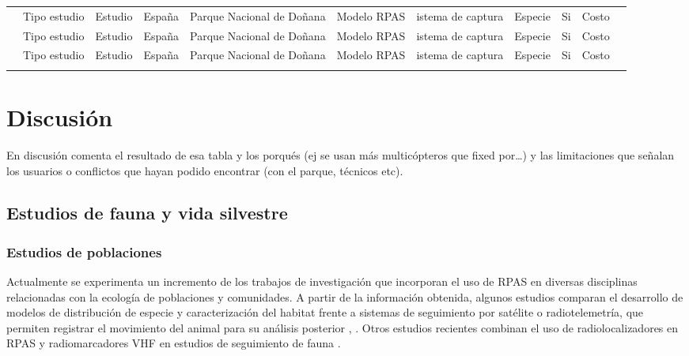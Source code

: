 \documentclass[11pt,]{article}
\begin{document}
\begin{sidewaystable}
\begin{tabular}{p{2.5cm}p{1cm}p{3cm}p{1cm}p{2cm}p{2cm}p{1cm}p{2cm}p{2cm}p{1cm}p{0.5cm}}
\cite{PazmanyMulero2015}  & Tipo estudio & Estudio & España & Parque Nacional de Doñana & Modelo RPAS & istema de captura & Especie & Si & Costo  \\ 
\cite{PazmanyMulero2015}  & Tipo estudio & Estudio & España & Parque Nacional de Doñana & Modelo RPAS  & istema de captura & Especie & Si & Costo  \\ 
\cite{PazmanyMulero2015}  & Tipo estudio & Estudio & España & Parque Nacional de Doñana & Modelo RPAS  & istema de captura & Especie & Si & Costo  \\ \\ \cmidrule(r){1-11}
\end{tabular}
\end{sidewaystable}

\section{Discusión}\label{discusion}

En discusión comenta el resultado de esa tabla y los porqués (ej se usan
más multicópteros que fixed por\ldots{}) y las limitaciones que señalan
los usuarios o conflictos que hayan podido encontrar (con el parque,
técnicos etc).

\subsection{Estudios de fauna y vida
silvestre}\label{estudios-de-fauna-y-vida-silvestre}

\subsubsection{Estudios de poblaciones}\label{estudios-de-poblaciones}

Actualmente se experimenta un incremento de los trabajos de
investigación que incorporan el uso de RPAS en diversas disciplinas
relacionadas con la ecología de poblaciones y comunidades. A partir de
la información obtenida, algunos estudios comparan el desarrollo de
modelos de distribución de especie y caracterización del habitat frente
a sistemas de seguimiento por satélite o radiotelemetría, que permiten
registrar el movimiento del animal para su análisis posterior
\citep{PazmanyMulero2015}, \citep{Mulero-Pazmany2015}. Otros estudios
recientes combinan el uso de radiolocalizadores en RPAS y
radiomarcadores VHF en estudios de seguimiento de fauna
\citep{Bayram2016}.
\end{document}
